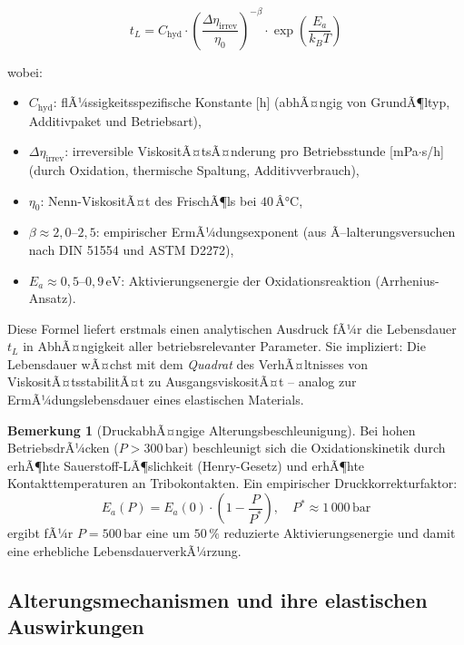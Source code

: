 ﻿\documentclass[a4paper,12pt]{scrreprt}
\theoremstyle{definition}
\newtheorem{bemerkung}{Bemerkung}[section]
\begin{document}
\begin{equation}
  \boxed{
    t_L = C_{\mathrm{hyd}} \cdot
      \left(\frac{\Delta\eta_{\mathrm{irrev}}}{\eta_0}\right)^{-\beta}
      \cdot \exp\!\left(\frac{E_a}{k_B T}\right)
  }
  \label{eq:lebensdauer_hydraulikÃ¶l}
\end{equation}

wobei:
\begin{itemize}
  \item $C_{\mathrm{hyd}}$: flÃ¼ssigkeitsspezifische Konstante [h]
    (abhÃ¤ngig von GrundÃ¶ltyp, Additivpaket und Betriebsart),
  \item $\Delta\eta_{\mathrm{irrev}}$: irreversible ViskositÃ¤tsÃ¤nderung
    pro Betriebsstunde [mPa$\cdot$s/h] (durch Oxidation, thermische Spaltung,
    Additivverbrauch),
  \item $\eta_0$: Nenn-ViskositÃ¤t des FrischÃ¶ls bei $40\,Â°\mathrm{C}$,
  \item $\beta \approx 2{,}0$--$2{,}5$: empirischer ErmÃ¼dungsexponent
    (aus Ã–lalterungsversuchen nach DIN 51554 und ASTM D2272),
  \item $E_a \approx 0{,}5$--$0{,}9\,\mathrm{eV}$: Aktivierungsenergie
    der Oxidationsreaktion (Arrhenius-Ansatz).
\end{itemize}

Diese Formel liefert erstmals einen analytischen Ausdruck fÃ¼r die
Lebensdauer $t_L$ in AbhÃ¤ngigkeit aller betriebsrelevanter Parameter.
Sie impliziert: Die Lebensdauer wÃ¤chst mit dem \emph{Quadrat} des
VerhÃ¤ltnisses von ViskositÃ¤tsstabilitÃ¤t zu AusgangsviskositÃ¤t --
analog zur ErmÃ¼dungslebensdauer eines elastischen Materials.

\begin{bemerkung}[DruckabhÃ¤ngige Alterungsbeschleunigung]
  Bei hohen BetriebsdrÃ¼cken ($P > 300\,\mathrm{bar}$) beschleunigt sich
  die Oxidationskinetik durch erhÃ¶hte Sauerstoff-LÃ¶slichkeit (Henry-Gesetz)
  und erhÃ¶hte Kontakttemperaturen an Tribokontakten. Ein empirischer
  Druckkorrekturfaktor:
  \begin{equation}
    E_a(P) = E_a(0) \cdot \left(1 - \frac{P}{P^*}\right),
    \quad P^* \approx 1\,000\,\mathrm{bar}
    \label{eq:ea_druckkorrektur}
  \end{equation}
  ergibt fÃ¼r $P = 500\,\mathrm{bar}$ eine um $50\,\%$ reduzierte
  Aktivierungsenergie und damit eine erhebliche LebensdauerverkÃ¼rzung.
\end{bemerkung}

\subsection{Alterungsmechanismen und ihre elastischen Auswirkungen}
\end{document}
